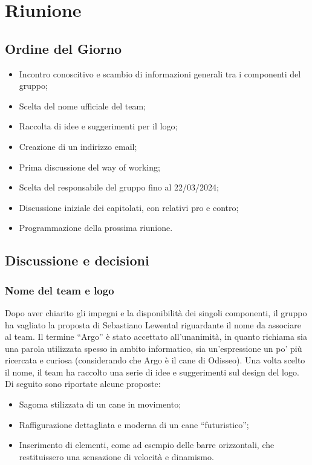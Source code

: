 \section{Riunione}
\subsection{Ordine del Giorno}
\begin{itemize}
	\item Incontro conoscitivo e scambio di informazioni generali tra i componenti del gruppo;
	\item Scelta del nome ufficiale del team;
	\item Raccolta di idee e suggerimenti per il logo;
	\item Creazione di un indirizzo email;
	\item Prima discussione del way of working;
	\item Scelta del responsabile del gruppo fino al 22/03/2024;
	\item Discussione iniziale dei capitolati, con relativi pro e contro;
	\item Programmazione della prossima riunione.
	
\end{itemize}

\subsection{Discussione e decisioni}

\subsubsection{Nome del team e logo}
Dopo aver chiarito gli impegni e la disponibilità dei singoli componenti, il gruppo ha vagliato la proposta di Sebastiano Lewental riguardante il nome da associare al team. Il termine “Argo” è stato accettato all’unanimità, in quanto richiama sia una parola utilizzata spesso in ambito informatico, sia un’espressione un po’ più ricercata e curiosa (considerando che Argo è il cane di Odisseo). Una volta scelto il nome, il team ha raccolto una serie di idee e suggerimenti sul design del logo.\\
Di seguito sono riportate alcune proposte:
\begin{itemize}
	\item Sagoma stilizzata di un cane in movimento;
	\item Raffigurazione dettagliata e moderna di un cane “futuristico”;
	\item Inserimento di elementi, come ad esempio delle barre orizzontali, che restituissero una sensazione di velocità e dinamismo.
\end{itemize}

